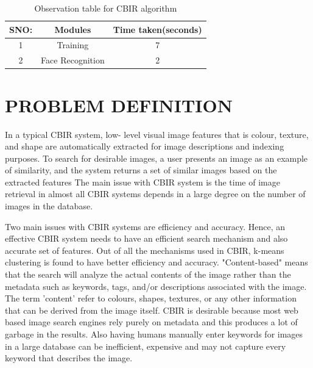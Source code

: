 \begin{table}[H]
\centering
\caption{Observation table for CBIR algorithm }
\label{routing}
\vspace{.5 cm}
\begin{tabular}{|c|c|c|}
\hline
\textbf{SNO:} &\textbf{Modules}       &\textbf{Time taken(seconds)}  \\
\hline
1     &Training    &   7      \\
      
\hline
2 &Face Recognition&2            \\
\hline
\end{tabular}
\end{table}
\clearpage
\chapter[PROBLEM DEFINITION]{\fontsize{16}{12}\selectfont PROBLEM DEFINITION}
\noindent
In a typical CBIR system, low- level visual image features that is colour, texture, and shape are automatically extracted for image descriptions and indexing purposes. To search for desirable images, a user presents an image as an example of similarity, and the system returns a set of similar images based on the extracted features  The main issue with CBIR system is the time of image retrieval in almost all CBIR systems depends in a large degree on the number of images in the database.

  \vspace*{1pc} 
Two main issues with CBIR systems are efficiency and accuracy. Hence, an effective CBIR system needs to have an efficient search mechanism and also accurate set of features. Out of all the mechanisms used in CBIR, k-means clustering is found to have better efficiency and accuracy. 
"Content-based" means that the search will analyze the actual contents of the image rather than the metadata such as keywords, tags, and/or descriptions associated with the image. The term 'content' refer to colours, shapes, textures, or any other information that can be derived from the image itself.
 CBIR is desirable because most web based image search engines rely purely on metadata and this produces a lot of garbage in the results. Also having humans manually enter keywords for images in a large database can be inefficient, expensive and may not capture every keyword that describes the image.
 
